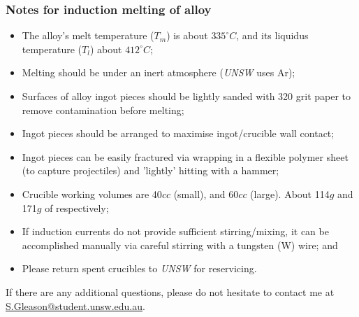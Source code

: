 \subsubsection{Notes for induction melting of \MgZnCa alloy}
\begin{itemize}
\item The \MgZnCa alloy's melt temperature ($T_{m}$) is about $335^{\circ}C$, and its liquidus temperature ($T_{l}$) about $412^{\circ}C$;
\item Melting should be under an inert atmosphere (\textit{UNSW} uses Ar);
\item Surfaces of alloy ingot pieces should be lightly sanded with 320 grit paper to remove contamination before melting;
\item Ingot pieces should be arranged to maximise ingot/crucible wall contact;
\item Ingot pieces can be easily fractured via wrapping in a flexible polymer sheet (to capture projectiles) and 'lightly' hitting with a hammer;
\item Crucible working volumes are 40$cc$ (small), and 60$cc$ (large). About 114$g$ and 171$g$ of \MgZnCa respectively;
\item If induction currents do not provide sufficient stirring/mixing, it can be accomplished manually via careful stirring with a tungsten (W) wire; and
\item Please return spent crucibles to \textit{UNSW} for reservicing. 
\end{itemize}

If there are any additional questions, please do not hesitate to contact me at \href{"mailto:s.gleason@student.unsw.edu.au"}{S.Gleason@student.unsw.edu.au}. 